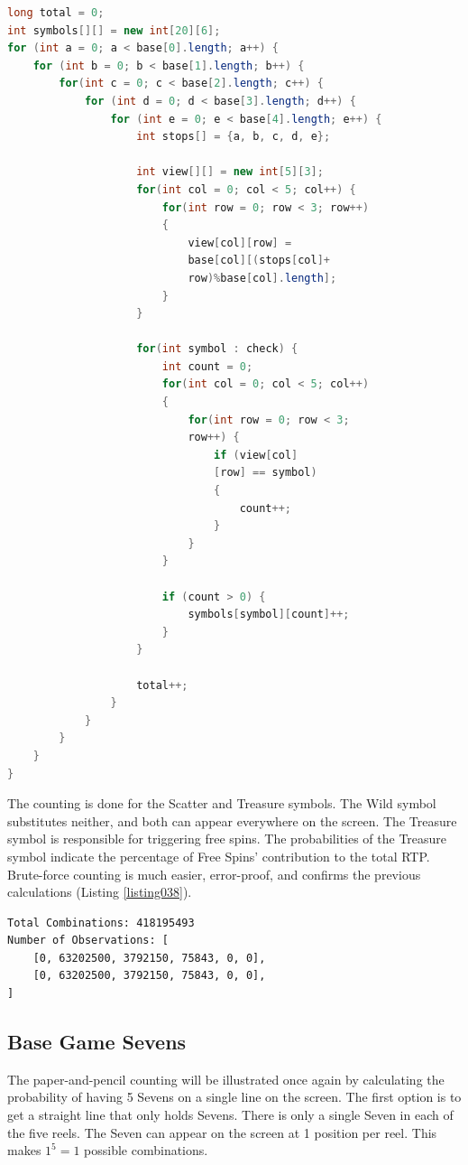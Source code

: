 \documentclass[12pt,twoside,openany]{book}
\begin{document}
\begin{lstlisting}[language=Java, caption={Brute-force generation of all base game screens}, label=listing037]
long total = 0;
int symbols[][] = new int[20][6];
for (int a = 0; a < base[0].length; a++) {
	for (int b = 0; b < base[1].length; b++) {
		for(int c = 0; c < base[2].length; c++) {
			for (int d = 0; d < base[3].length; d++) {
				for (int e = 0; e < base[4].length; e++) {
					int stops[] = {a, b, c, d, e};

					int view[][] = new int[5][3];
					for(int col = 0; col < 5; col++) {
						for(int row = 0; row < 3; row++) 
						{
							view[col][row] = 
							base[col][(stops[col]+
							row)%base[col].length];
						}
					}

					for(int symbol : check) {
						int count = 0;
						for(int col = 0; col < 5; col++) 
						{
							for(int row = 0; row < 3; 
							row++) {
								if (view[col]
								[row] == symbol) 
								{
									count++;
								}
							}
						}

						if (count > 0) {
							symbols[symbol][count]++;
						}
					}

					total++;
				}
			}
		}
	}
}
\end{lstlisting}

The counting is done for the Scatter and Treasure symbols. The Wild symbol substitutes neither, and both can appear everywhere on the screen. The Treasure symbol is responsible for triggering free spins. The probabilities of the Treasure symbol indicate the percentage of Free Spins' contribution to the total RTP. Brute-force counting is much easier, error-proof, and confirms the previous calculations (Listing \ref{listing038}).

\begin{lstlisting}[language=bash, caption={Counting of Scatters and Treasures}, label=listing038]
Total Combinations: 418195493
Number of Observations: [
	[0, 63202500, 3792150, 75843, 0, 0],
	[0, 63202500, 3792150, 75843, 0, 0],
]
\end{lstlisting}

\subsection*{Base Game Sevens}

The paper-and-pencil counting will be illustrated once again by calculating the probability of having 5 Sevens on a single line on the screen. The first option is to get a straight line that only holds Sevens. There is only a single Seven in each of the five reels. The Seven can appear on the screen at 1 position per reel. This makes $1^5 = 1$ possible combinations.
\end{document}
